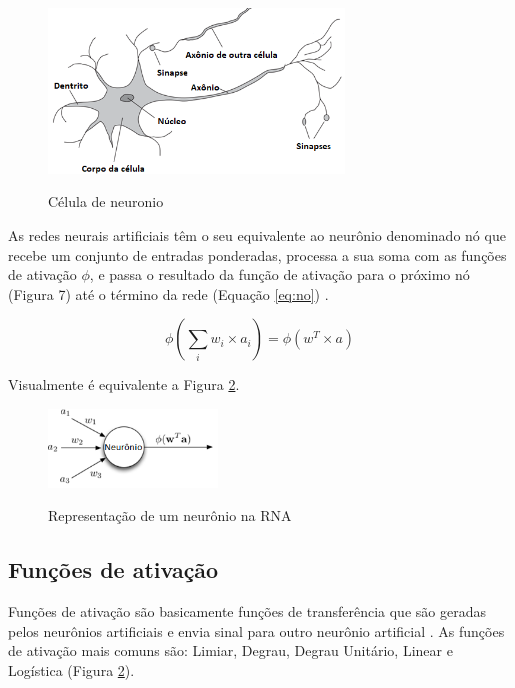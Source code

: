 \begin{figure}[h]
    \caption{Célula de neuronio}
    \centering
    \includegraphics[width=0.7\textwidth]{Textuais/Figuras/celula.png}
    \label{fig:celula}
\end{figure}

As redes neurais artificiais têm o seu equivalente ao neurônio denominado nó que recebe um conjunto de entradas ponderadas, processa a sua soma com as funções de ativação $\phi$, e passa o resultado da função de ativação para o próximo nó (Figura 7) até o término da rede (Equação \ref{eq:no}) \cite{ann}.

\begin{equation}
\label{eq:no}
    \phi \left( \sum_{i} w_i\times a_i \right) = \phi(w^T\times a)
\end{equation}

Visualmente é equivalente a Figura \ref{fig:neuronio-rna}.

\begin{figure}[h]
    \caption{Representação de um neurônio na RNA}
    \centering
    \includegraphics[width=0.4\textwidth]{Textuais/Figuras/rep-neronio.png}
    \label{fig:neuronio-rna}
\end{figure}

\subsection{Funções de ativação}

Funções de ativação são basicamente funções de transferência que são geradas pelos neurônios artificiais e envia sinal para outro neurônio artificial \cite{ann}. As funções de ativação mais comuns são: Limiar, Degrau, Degrau Unitário, Linear e Logística (Figura \ref{fig:neuronio-rna}). 


